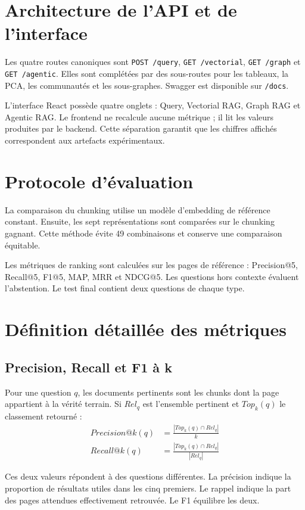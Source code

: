 \documentclass[12pt,a4paper,oneside]{report}
\newcommand{\tech}[1]{\texttt{#1}}
\begin{document}
\section{Architecture de l'API et de l'interface}
Les quatre routes canoniques sont \tech{POST /query}, \tech{GET /vectorial}, \tech{GET /graph} et \tech{GET /agentic}. Elles sont complétées par des sous-routes pour les tableaux, la PCA, les communautés et les sous-graphes. Swagger est disponible sur \tech{/docs}.

L'interface React possède quatre onglets : Query, Vectorial RAG, Graph RAG et Agentic RAG. Le frontend ne recalcule aucune métrique ; il lit les valeurs produites par le backend. Cette séparation garantit que les chiffres affichés correspondent aux artefacts expérimentaux.

\section{Protocole d'évaluation}
La comparaison du chunking utilise un modèle d'embedding de référence constant. Ensuite, les sept représentations sont comparées sur le chunking gagnant. Cette méthode évite 49 combinaisons et conserve une comparaison équitable.

Les métriques de ranking sont calculées sur les pages de référence : Precision@5, Recall@5, F1@5, MAP, MRR et NDCG@5. Les questions hors contexte évaluent l'abstention. Le test final contient deux questions de chaque type.


\section{Définition détaillée des métriques}
\subsection{Precision, Recall et F1 à k}
Pour une question $q$, les documents pertinents sont les chunks dont la page appartient à la vérité terrain. Si $Rel_q$ est l'ensemble pertinent et $Top_k(q)$ le classement retourné :
\begin{align}
Precision@k(q) &= \frac{|Top_k(q) \cap Rel_q|}{k} \\
Recall@k(q) &= \frac{|Top_k(q) \cap Rel_q|}{|Rel_q|}
\end{align}

Ces deux valeurs répondent à des questions différentes. La précision indique la proportion de résultats utiles dans les cinq premiers. Le rappel indique la part des pages attendues effectivement retrouvée. Le F1 équilibre les deux.
\end{document}
